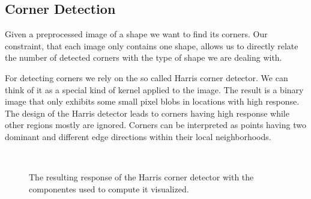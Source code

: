 \documentclass[conference]{IEEEtran}
\begin{document}
\subsection{Corner Detection}
\label{sub:corner_detection}
Given a preprocessed image of a shape we want to find its corners. 
Our constraint, that each image only contains one shape, 
allows us to directly relate the number of detected corners with the type of shape we are dealing with. 

For detecting corners we rely on the so called Harris\cite{Harris88acombined} corner detector. 
We can think of it as a special kind of kernel applied to the image. 
The result is a binary image that only exhibits some small pixel blobs in locations with high response.
The design of the Harris detector leads to corners having high response while other regions mostly
are ignored. Corners can be interpreted as points having two dominant and different edge directions
within their local neighborhoods. 

\begin{figure}[ht!]%
\centering
{}
\\
\caption{The resulting response of the Harris corner detector with the componentes
used to compute it visualized.}
\end{figure}
\end{document}

